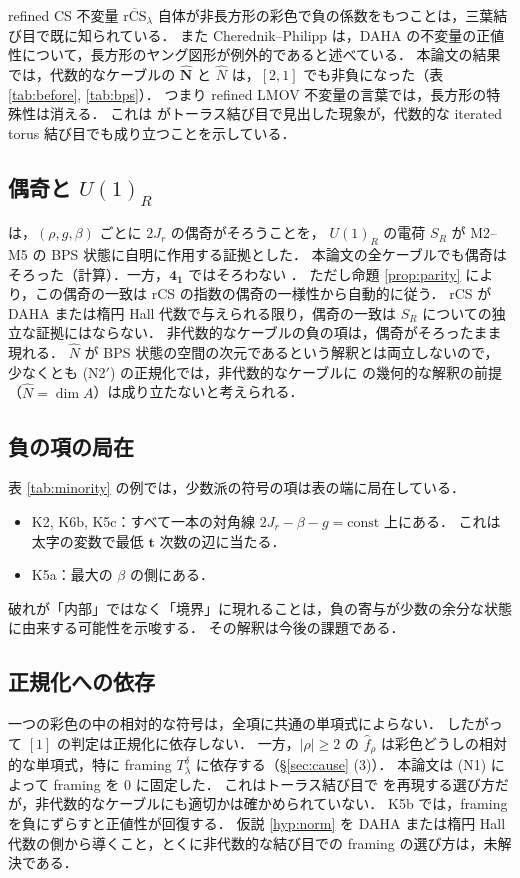 \documentclass[11pt,a4paper]{ltjsarticle}
\theoremstyle{definition}
\theoremstyle{remark}
\newcommand{\rCS}{\overline{\mathrm{rCS}}}
\newcommand{\bt}{\mathbf{t}}
\newcommand{\hN}{\widehat{N}}
\newcommand{\hf}{\widehat{f}}
\newcommand{\hbN}{\widehat{\mathbf{N}}}
\begin{document}
refined CS 不変量 $\rCS_\lambda$ 自体が非長方形の彩色で負の係数をもつことは，三葉結び目で既に知られている．
また Cherednik--Philipp \cite{CP} は，DAHA の不変量の正値性について，長方形のヤング図形が例外的であると述べている．
本論文の結果では，代数的なケーブルの $\hbN$ と $\hN$ は，$[2,1]$ でも非負になった（表 \ref{tab:before}, \ref{tab:bps}）．
つまり refined LMOV 不変量の言葉では，長方形の特殊性は消える．
これは \cite{KN} がトーラス結び目で見出した現象が，代数的な iterated torus 結び目でも成り立つことを示している．

\subsection{偶奇と $U(1)_R$}

\cite{KN} は，$(\rho,g,\beta)$ ごとに $2J_r$ の偶奇がそろうことを，
$U(1)_R$ の電荷 $S_R$ が M2--M5 の BPS 状態に自明に作用する証拠とした．
本論文の全ケーブルでも偶奇はそろった（計算）．一方，$\mathbf{4_1}$ ではそろわない \cite{KN}．
ただし命題 \ref{prop:parity} により，この偶奇の一致は rCS の指数の偶奇の一様性から自動的に従う．
rCS が DAHA または楕円 Hall 代数で与えられる限り，偶奇の一致は $S_R$ についての独立な証拠にはならない．
非代数的なケーブルの負の項は，偶奇がそろったまま現れる．
$\hN$ が BPS 状態の空間の次元であるという解釈とは両立しないので，
少なくとも (N2$'$) の正規化では，非代数的なケーブルに \cite{KN} の幾何的な解釈の前提（$\hN=\dim A$）は成り立たないと考えられる．

\subsection{負の項の局在}

表 \ref{tab:minority} の例では，少数派の符号の項は表の端に局在している．
\begin{itemize}
\item K2, K6b, K5c：すべて一本の対角線 $2J_r-\beta-g=\mathrm{const}$ 上にある．
  これは太字の変数で最低 $\bt$ 次数の辺に当たる．
\item K5a：最大の $\beta$ の側にある．
\end{itemize}
破れが「内部」ではなく「境界」に現れることは，負の寄与が少数の余分な状態に由来する可能性を示唆する．
その解釈は今後の課題である．

\subsection{正規化への依存}

一つの彩色の中の相対的な符号は，全項に共通の単項式によらない．
したがって $[1]$ の判定は正規化に依存しない．
一方，$|\rho|\ge2$ の $\hf_\rho$ は彩色どうしの相対的な単項式，特に framing $T_\lambda^\delta$ に依存する（\S\ref{sec:cause} (3)）．
本論文は (N1) によって framing を 0 に固定した．
これはトーラス結び目で \cite{KN} を再現する選び方だが，非代数的なケーブルにも適切かは確かめられていない．
K5b では，framing を負にずらすと正値性が回復する．
仮説 \ref{hyp:norm} を DAHA または楕円 Hall 代数の側から導くこと，とくに非代数的な結び目での framing の選び方は，未解決である．
\end{document}
